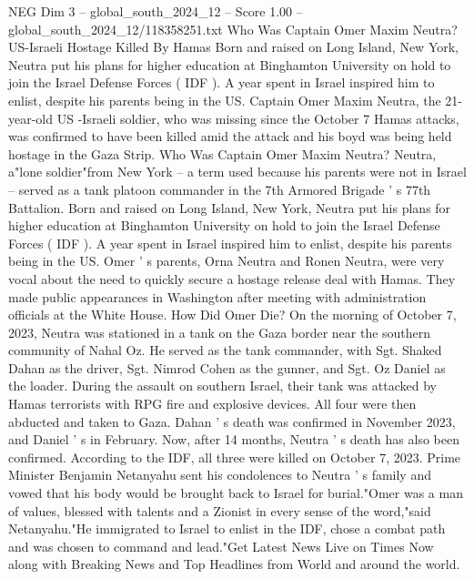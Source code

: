 \begin{textsample}{NEG Dim 3 – global\_south\_2024\_12 – Score 1.00 – global\_south\_2024\_12/118358251.txt}  \label{ex:f3_neg_069}
Who Was Captain Omer Maxim Neutra?
US-Israeli Hostage Killed By Hamas Born and raised on Long Island, New York, Neutra put his plans for higher education at Binghamton University on hold to join the Israel Defense Forces ( IDF ).
A year spent in Israel inspired him to enlist, despite his parents being in the US.
Captain Omer Maxim Neutra, the 21-year-old US -Israeli soldier, who was missing since the October 7 Hamas attacks, was confirmed to have been killed amid the attack and his boyd was being held hostage in the Gaza Strip.
Who Was Captain Omer Maxim Neutra?
Neutra, a"lone soldier"from New York -- a term used because his parents were not in Israel -- served as a tank platoon commander in the 7th Armored Brigade ' s 77th Battalion.
Born and raised on Long Island, New York, Neutra put his plans for higher education at Binghamton University on hold to join the Israel Defense Forces ( IDF ).
A year spent in Israel inspired him to enlist, despite his parents being in the US.
Omer ' s parents, Orna Neutra and Ronen Neutra, were very vocal about the need to quickly secure a hostage release deal with Hamas.
They made public appearances in Washington after meeting with administration officials at the White House.
How Did Omer Die?
On the morning of October 7, 2023, Neutra was stationed in a tank on the Gaza border near the southern community of Nahal Oz.
He served as the tank commander, with Sgt.
Shaked Dahan as the driver, Sgt.
Nimrod Cohen as the gunner, and Sgt.
Oz Daniel as the loader.
During the assault on southern Israel, their tank was attacked by Hamas terrorists with RPG fire and explosive devices.
All four were then abducted and taken to Gaza.
Dahan ' s death was confirmed in November 2023, and Daniel ' s in February.
Now, after 14 months, Neutra ' s death has also been confirmed.
According to the IDF, all three were killed on October 7, 2023.
Prime Minister Benjamin Netanyahu sent his condolences to Neutra ' s family and vowed that his body would be brought back to Israel for burial."Omer was a man of values, blessed with talents and a Zionist in every sense of the word,"said Netanyahu."He immigrated to Israel to enlist in the IDF, chose a combat path and was chosen to command and lead."Get Latest News Live on Times Now along with Breaking News and Top Headlines from World and around the world.

\end{textsample}
